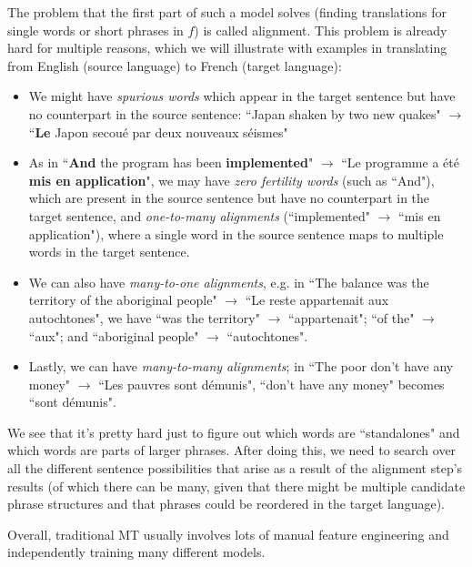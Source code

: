 The problem that the first part of such a model solves (finding translations for single words or short phrases in $f$) is called alignment. This problem is already hard for multiple reasons, which we will illustrate with examples in translating from English (source language) to French (target language):
\begin{itemize}
\item We might have \emph{spurious words} which appear in the target sentence but have no counterpart in the source sentence: ``Japan shaken by two new quakes" $\rightarrow$ ``\textbf{Le} Japon secou\'e par deux nouveaux s\'eismes"
\item As in ``\textbf{And} the program has been \textbf{implemented}" $\rightarrow$ ``Le programme a \'et\'e \textbf{mis en application}", we may have \emph{zero fertility words} (such as ``And"), which are present in the source sentence but have no counterpart in the target sentence, and \emph{one-to-many alignments} (``implemented" $\rightarrow$ ``mis en application"), where a single word in the source sentence maps to multiple words in the target sentence.
\item We can also have \emph{many-to-one alignments}, e.g. in ``The balance was the territory of the aboriginal people" $\rightarrow$ ``Le reste appartenait aux autochtones", we have ``was the territory" $\rightarrow$ ``appartenait"; ``of the" $\rightarrow$ ``aux"; and ``aboriginal people" $\rightarrow$ ``autochtones".
\item Lastly, we can have \emph{many-to-many alignments}; in ``The poor don't have any money" $\rightarrow$ ``Les pauvres sont d\'emunis", ``don't have any money" becomes ``sont d\'emunis".
\end{itemize}
We see that it's pretty hard just to figure out which words are ``standalones" and which words are parts of larger phrases. After doing this, we need to search over all the different sentence possibilities that arise as a result of the alignment step's results (of which there can be many, given that there might be multiple candidate phrase structures and that phrases could be reordered in the target language). 

Overall, traditional MT usually involves lots of manual feature engineering and independently training many different models.

